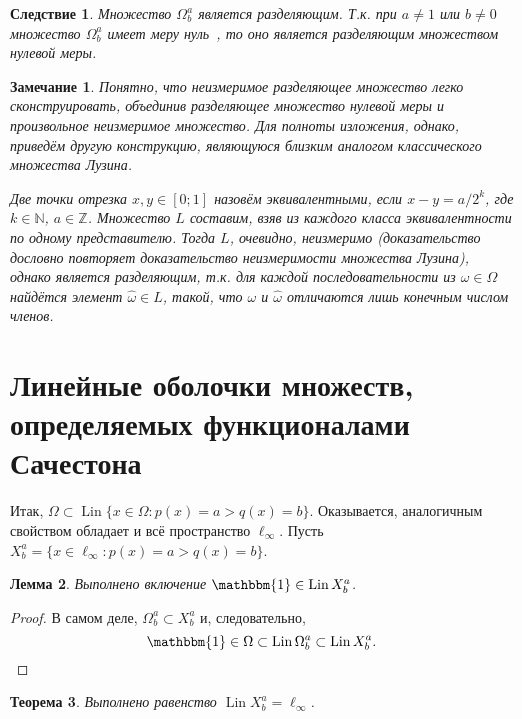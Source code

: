 \documentclass[a4paper,14pt]{article} %
\theoremstyle{plain}
\newtheorem{lemma}{Лемма}[section]
\newtheorem{theorem}[lemma]{Теорема}
\newtheorem{remark}[lemma]{Замечание}
\newtheorem{corollary}{Следствие}[lemma]
\begin{document}
\begin{corollary}
	Множество $\Omega^a_b$ является разделяющим.
	Т.к. при $a\neq 1$ или $b\neq 0$ множество $\Omega^a_b$ имеет меру нуль~\cite{semenov2010characteristic},
	то оно является разделяющим множеством нулевой меры.
\end{corollary}

\begin{remark}
	Понятно, что неизмеримое разделяющее множество легко сконструировать,
	объединив разделяющее множество нулевой меры и произвольное неизмеримое множество.
	Для полноты изложения, однако, приведём другую конструкцию, являющуюся близким аналогом классического множества Лузина.

	Две точки отрезка $x,y \in [0;1]$ назовём эквивалентными, если
	$x - y = a/2^k$, где $k\in\mathbb{N}$, $a\in\mathbb{Z}$.
	Множество $L$ составим, взяв из каждого класса эквивалентности по одному представителю.
	Тогда $L$, очевидно, неизмеримо (доказательство дословно повторяет доказательство неизмеримости множества Лузина),
	однако является разделяющим, т.к. для каждой последовательности из $\omega\in\Omega$
	найдётся элемент $\hat\omega\in L$, такой, что $\omega$ и $\hat\omega$ отличаются лишь конечным числом членов.
\end{remark}


\section{Линейные оболочки множеств, определяемых функционалами Сачестона}

Итак, $\Omega \subset \operatorname{Lin}\{x\in\Omega : p(x) = a > q(x) = b\}$.
Оказывается, аналогичным свойством обладает и всё пространство $\ell_\infty$.
Пусть $X^a_b = \{x\in\ell_\infty : p(x) = a > q(x) = b\}$.

\begin{lemma}
	\label{lem:const_Lin_ell_infty}
	Выполнено включение
	$\mathbbm{1}\in \operatorname{Lin} X^a_b$.
\end{lemma}

\begin{proof}
	В самом деле,
	$\Omega^a_b \subset X^a_b$
	и, следовательно,
	\begin{equation}
		\mathbbm{1} \in \Omega \subset \operatorname{Lin} \Omega^a_b \subset \operatorname{Lin} X^a_b
		.
	\end{equation}
\end{proof}

\begin{theorem}
	\label{thm:Lin_ell_infty}
	Выполнено равенство $\operatorname{Lin} X^a_b = \ell_\infty$.
\end{theorem}
\end{document}
